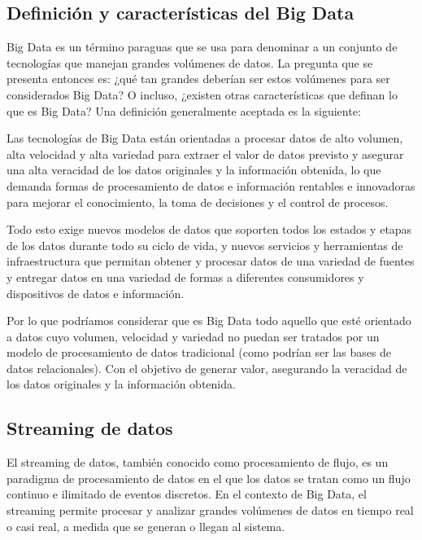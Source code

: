 \newpage
\subsection{Definición y características del Big Data}

Big Data es un término paraguas que se usa para denominar a un conjunto de tecnologías que manejan grandes volúmenes de datos.
La pregunta que se presenta entonces es: ¿qué tan grandes deberían ser estos volúmenes para ser considerados Big Data?
O incluso, ¿existen otras características que definan lo que es Big Data?
Una definición generalmente aceptada es la siguiente:
\bigskip

Las tecnologías de Big Data están orientadas a
procesar datos de alto volumen, alta velocidad y alta variedad
para extraer el valor de datos previsto y asegurar una alta
veracidad de los datos originales y la información obtenida, lo que demanda
formas de procesamiento de datos e información rentables e innovadoras
para mejorar el conocimiento, la toma de decisiones y el control de procesos. \newline

Todo esto exige nuevos modelos de datos
que soporten todos los estados y etapas de los datos durante todo su ciclo de vida, 
y nuevos servicios y herramientas de infraestructura que permitan obtener y procesar
datos de una variedad de fuentes y
entregar datos en una variedad de formas a diferentes consumidores y dispositivos
de datos e información. \parencite{demchenko2014addressing}

\newpage
Por lo que podríamos considerar que es Big Data todo aquello que esté orientado a datos
cuyo volumen, velocidad y variedad no puedan ser tratados por un modelo de procesamiento
de datos tradicional (como podrían ser las bases de datos relacionales). Con el objetivo
de generar valor, asegurando la veracidad de los datos originales y la información obtenida.

\subsection{Streaming de datos}

El streaming de datos, también conocido como procesamiento de flujo, es un paradigma 
de procesamiento de datos en el que los datos se tratan como un flujo continuo e 
ilimitado de eventos discretos. En el contexto de Big Data, el streaming permite procesar 
y analizar grandes volúmenes de datos en tiempo real o casi real, a medida que se generan 
o llegan al sistema. \parencite{flink}

